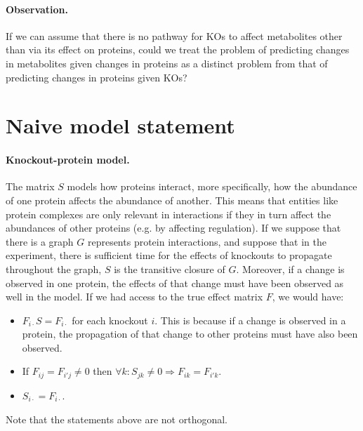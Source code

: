 \documentclass{article}
\begin{document}
\paragraph{Observation.} If we can assume that there is no pathway for KOs to affect metabolites other than via its effect on proteins, could we treat the problem of predicting changes in metabolites given changes in proteins as a distinct problem from that of predicting changes in proteins given KOs?

\section{Naive model statement}

\paragraph{Knockout-protein model.}
The matrix $S$ models how proteins interact, more specifically, how the abundance of one protein affects the abundance of another.
This means that entities like protein complexes are only relevant in interactions if they in turn affect the abundances of other proteins (e.g. by affecting regulation).
If we suppose that there is a graph $G$ represents protein interactions, and suppose that in the experiment, there is sufficient time for the effects of knockouts to propagate throughout the graph, $S$ is the transitive closure of $G$.
Moreover, if a change is observed in one protein, the effects of that change must have been observed as well in the model.
If we had access to the true effect matrix $F$, we would have:
\begin{itemize}
 \item $F_{i \cdot} S = F_{i \cdot}$ for each knockout $i$. This is because if a change is observed in a protein, the propagation of that change to other proteins must have also been observed.
 \item If $F_{i j} = F_{i' j} \neq 0$ then $\forall k : S_{j k} \neq 0 \Rightarrow F_{i k} = F_{i' k}$.
 \item $S_{i \cdot} = F_{i \cdot}$.
\end{itemize}
Note that the statements above are not orthogonal.
\end{document}
